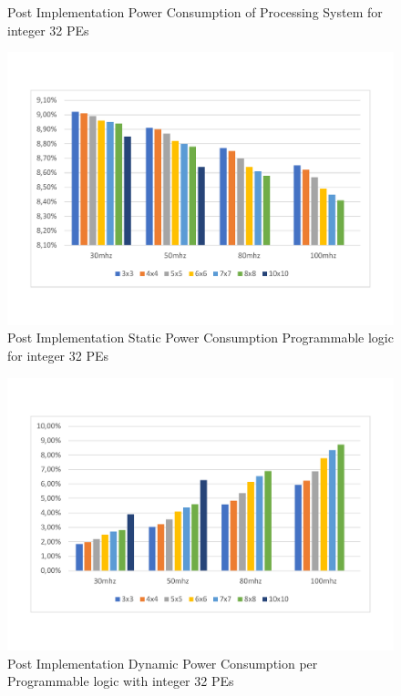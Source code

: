 \begin{itemize}
\begin{figure}[!htbp]
\caption{Post Implementation Power Consumption of Processing System for integer 32 PEs}
\label{fig:powint32}
\end{figure}
\begin{figure}[!htbp]
\centering
\captionsetup{justification=centering}
\includegraphics[scale=0.5,angle=0]{./figure/graphs/power_plstatic_int32_freq.pdf}
\caption{Post Implementation Static Power Consumption Programmable logic for integer 32 PEs }
\label{fig:staticpowint32}
\end{figure}
\begin{figure}[!htbp]
\centering
\captionsetup{justification=centering}
\includegraphics[scale=0.5,angle=0]{./figure/graphs/power_pldyn_int32_freq.pdf}
\caption{Post Implementation Dynamic Power Consumption per Programmable logic with integer 32 PEs}
\label{fig:dynpowint32}

\end{figure}
\end{itemize}
